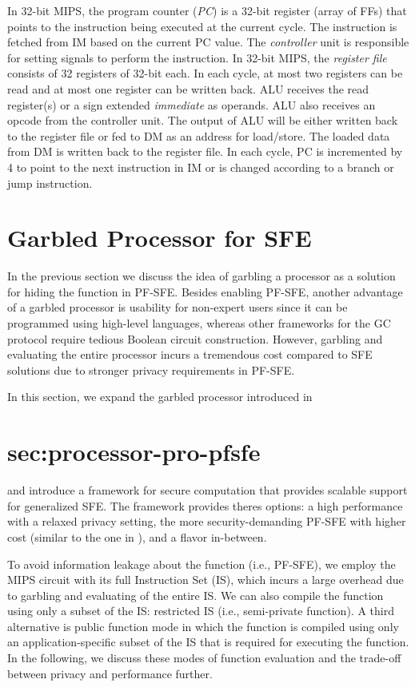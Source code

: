 In 32-bit MIPS, the program counter (\emph{PC}) is a 32-bit register (array of FFs) that points to the instruction being executed at the current cycle.
The instruction is fetched from IM based on the current PC value.
The \emph{controller} unit is responsible for setting signals to perform the instruction.
In 32-bit MIPS, the \emph{register file} consists of 32 registers of 32-bit each.
In each cycle, at most two registers can be read and at most one register can be written back.
ALU receives the read register(s) or a sign extended \emph{immediate} as operands.
ALU also receives an opcode from the controller unit.
The output of ALU will be either written back to the register file or fed to DM as an address for load/store.
The loaded data from DM is written back to the register file.
In each cycle, PC is incremented by 4 to point to the next instruction in IM or is changed according to a branch or jump instruction.

\section{Garbled Processor for SFE}\label{sec:processor-mips-sfe}
In the previous section we discuss the idea of garbling a processor as a solution for hiding the function in PF-SFE.
Besides enabling PF-SFE, another advantage of a garbled processor is usability for non-expert users since it can be programmed using high-level languages, whereas other frameworks for the GC protocol require tedious Boolean circuit construction.
However, garbling and evaluating the entire processor incurs a tremendous cost compared to SFE solutions due to stronger privacy requirements in PF-SFE.

In this section, we expand the garbled processor introduced in \section{sec:processor-pro-pfsfe} and introduce a framework for secure computation that provides scalable support for generalized SFE.
The framework provides theres options: a high performance with a relaxed privacy setting, the more security-demanding PF-SFE with higher cost (similar to the one in ), and a flavor in-between.

To avoid information leakage about the function (i.e., PF-SFE), we employ the MIPS circuit with its full Instruction Set (IS), which incurs a large overhead due to garbling and evaluating of the entire IS.
We can also compile the function using only a subset of the IS: restricted IS (i.e., semi-private function).
A third alternative is public function mode in which the function is compiled using only an application-specific subset of the IS that is required for executing the function.
In the following, we discuss these modes of function evaluation and the trade-off between privacy and performance further.

